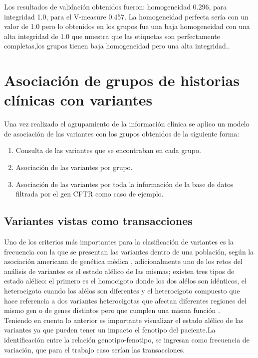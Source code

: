 Los resultados de validación obtenidos fueron: homogeneidad 0.296, para integridad 1.0, para el V-measure 0.457. La homogeneidad perfecta sería con un valor de 1.0 pero lo obtenidos en los grupos fue una baja homogeneidad con una alta  integridad de 1.0 que muestra que las etiquetas son perfectamente completas,los grupos tienen  baja homogeneidad pero una alta integridad.\cite{scikit-learn}. 


\section{Asociación de grupos de historias clínicas con variantes}

Una vez realizado el agrupamiento de la información clínica se aplico un modelo de asociación de las variantes con los grupos obtenidos de la siguiente forma:

\begin{enumerate}
	\item Consulta de las variantes que se encontraban en cada grupo.
	\item Asociación de las variantes por grupo.
	\item Asociación de las variantes por toda la información de la base de datos filtrada por el gen CFTR como caso de ejemplo.
\end{enumerate}

\subsection{Variantes vistas como transacciones}

Uno de los criterios más importantes para la clasificación de variantes es la frecuencia con la que se presentan las variantes dentro de una población, según la asociación americana de genética médica \cite{Laboratories2015}, adicionalmente uno de los retos del análisis de variantes es el estado alélico de las mismas; existen tres tipos de estado alélico: el primero es el homocigoto donde los dos alélos son idénticos, el heterocigoto cuando los alélos son diferentes y el heterocigoto compuesto que hace referencia a dos variantes heterocigotas que afectan diferentes regiones del mismo gen o de genes distintos pero que cumplen una misma función \cite{Klug2013,Compound2012}.\\

Teniendo en cuenta lo anterior es importante visualizar el estado alélico de las variantes \cite{Hannah-Shmouni2015,Laboratories2015} ya que pueden tener un impacto el fenotipo del paciente.La identificación entre la relación genotipo-fenotipo, se ingresan como frecuencia de variación, que para el trabajo caso serían las transacciones\cite{Breuer2017}.\\

